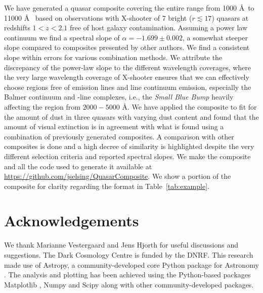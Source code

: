 \documentclass{aa}    %
\newcommand{\Tab}[1]{Table~\ref{tab:#1}}
\newcommand{\tab}[1]{\Tab{#1}}
\newcommand{\sectlabel}[1]{\label{sect:#1}}
\newcommand{\feii}{\ion{Fe}{ii}}
\begin{document}
We have generated a quasar composite covering the entire range from 1000 \AA~to
11000 \AA~ based on observations with X-shooter of 7 bright ($r \lesssim 17$)
quasars at redshifts $1 < z < 2.1$ free of host galaxy contamination. Assuming a
power law continuum we find a spectral slope of $\alpha = -1.699 \pm 0.002$, a
somewhat steeper slope compared to composites presented by other authors. We
find a consistent slope within errors for various combination methods. We
attribute the discrepancy of the power-law slope to the different wavelength
coverages, where the very large wavelength coverage of X-shooter ensures that we
can effectively choose regions free of emission lines and line continuum
emission, especially the Balmer continuum and \feii-line complexes, i.e., the
\textit{Small Blue Bump} heavily affecting the region from $2000 - 5000$ \AA. We
have applied the composite to fit for the amount of dust in three quasars with
varying dust content and found that the amount of visual extinction is in
agreement with what is found using a combination of previously generated
composites. A comparison with other composites is done and a high decree of
similarity is highlighted despite the very different selection criteria and
reported spectral slopes.
We make the composite and all the code used to generate it available at
\url{https://github.com/jselsing/QuasarComposite}. We show a portion of the
composite for clarity regarding the format in \tab{example}.

 


\section{Acknowledgements}  \sectlabel{Acknowledgements}

We thank Marianne Vestergaard and Jens Hjorth for useful discussions and
suggestions. The Dark Cosmology Centre is funded by the DNRF.  
This research made use of Astropy, a community-developed core Python package for
Astronomy \citep{TheAstropyCollaboration2013}. The analysis and plotting has been achieved using the Python-based packages Matplotlib \citep{Hunter2007}, Numpy and Scipy \citep{VanderWalt2011} along with other community-developed packages. 



\clearpage


\clearpage
\end{document}
